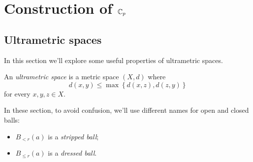\chapter{Construction of $\mathbb{C}_p$}
	\section{Ultrametric spaces}
		\label{section:ultrametrics}
		In this section we'll explore some useful properties of ultrametric spaces. 
		\begin{defn}
			An \emph{ultrametric space} is a metric space $(X, d)$ where 
			\[
			d(x ,y) \leq \max\left\{d(x, z), d(z, y)\right\}
			\]
			for every $x, y, z \in X$.
		\end{defn}
		In these section, to avoid confusion, we'll use different names for open and closed balls:
		\begin{itemize}
			\item $B_{< r}(a)$ is a \textit{stripped ball};
			\item $B_{\leq r}(a)$ is a \textit{dressed ball}.
		\end{itemize}
		
